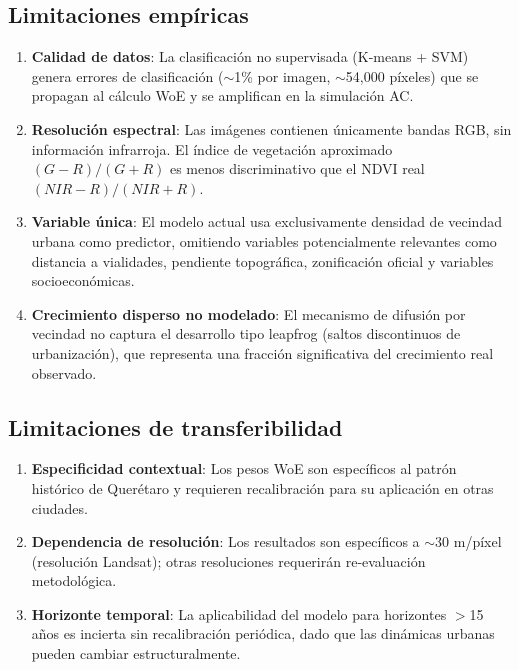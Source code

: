 \subsection{Limitaciones empíricas}

\begin{enumerate}
	\item \textbf{Calidad de datos}: La clasificación no supervisada (K-means + SVM) genera errores de clasificación ($\sim$1\% por imagen, $\sim$54{,}000 píxeles) que se propagan al cálculo WoE y se amplifican en la simulación AC.

	\item \textbf{Resolución espectral}: Las imágenes contienen únicamente bandas RGB, sin información infrarroja. El índice de vegetación aproximado $(G-R)/(G+R)$ es menos discriminativo que el NDVI real $(NIR-R)/(NIR+R)$.

	\item \textbf{Variable única}: El modelo actual usa exclusivamente densidad de vecindad urbana como predictor, omitiendo variables potencialmente relevantes como distancia a vialidades, pendiente topográfica, zonificación oficial y variables socioeconómicas.

	\item \textbf{Crecimiento disperso no modelado}: El mecanismo de difusión por vecindad no captura el desarrollo tipo leapfrog (saltos discontinuos de urbanización), que representa una fracción significativa del crecimiento real observado.
\end{enumerate}

\subsection{Limitaciones de transferibilidad}

\begin{enumerate}
	\item \textbf{Especificidad contextual}: Los pesos WoE son específicos al patrón histórico de Querétaro y requieren recalibración para su aplicación en otras ciudades.

	\item \textbf{Dependencia de resolución}: Los resultados son específicos a $\sim$30 m/píxel (resolución Landsat); otras resoluciones requerirán re-evaluación metodológica.

	\item \textbf{Horizonte temporal}: La aplicabilidad del modelo para horizontes $>$15 años es incierta sin recalibración periódica, dado que las dinámicas urbanas pueden cambiar estructuralmente.
\end{enumerate}

